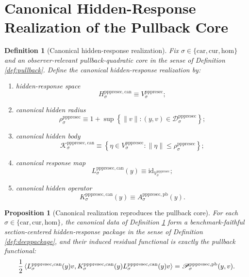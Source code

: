 \documentclass[11pt]{article}
\newcommand{\Car}{\mathrm{car}}
\newcommand{\Cur}{\mathrm{cur}}
\newcommand{\Hom}{\mathrm{hom}}
\newcommand{\PrePreProtoSectionVertical}[1]{V_{#1}^{\mathrm{pppresec}}}
\newcommand{\PrePreProtoSectionResidualBody}[1]{\mathcal D_{#1}^{\mathrm{pppresec}}}
\newcommand{\PrePreProtoSectionPullbackOperator}[1]{A_{#1}^{\mathrm{pppresec,pb}}}
\newcommand{\PrePreProtoSectionPullbackFunctional}[1]{\mathscr P_{#1}^{\mathrm{pppresec,pb}}}
\newcommand{\CanonicalHiddenSpace}[1]{H_{#1}^{\mathrm{pppresec,can}}}
\newcommand{\CanonicalHiddenBody}[1]{\mathcal K_{#1}^{\mathrm{pppresec,can}}}
\newcommand{\CanonicalResponseMap}[1]{L_{#1}^{\mathrm{pppresec,can}}}
\newcommand{\CanonicalHiddenOperator}[1]{K_{#1}^{\mathrm{pppresec,can}}}
\newcommand{\CanonicalHiddenRadius}[1]{\rho_{#1}^{\mathrm{pppresec}}}
\newtheorem{definition}{Definition}
\newtheorem{proposition}{Proposition}
\begin{document}
\section{Canonical Hidden-Response Realization of the Pullback Core}

\begin{definition}[Canonical hidden-response realization]
\label{def:canonical}
Fix \(\sigma\in\{\Car,\Cur,\Hom\}\) and an observer-relevant pullback-quadratic core in the sense of Definition \ref{def:pullback}. Define the canonical hidden-response realization by:
\begin{enumerate}
    \item hidden-response space
    \[
    \CanonicalHiddenSpace{\sigma}
    \equiv
    \PrePreProtoSectionVertical{\sigma};
    \]
    \item canonical hidden radius
    \[
    \CanonicalHiddenRadius{\sigma}
    \equiv
    1+
    \sup\left\{
    \|v\|:(y,v)\in\PrePreProtoSectionResidualBody{\sigma}
    \right\};
    \]
    \item canonical hidden body
    \[
    \CanonicalHiddenBody{\sigma}
    \equiv
    \left\{
    \eta\in\PrePreProtoSectionVertical{\sigma}:
    \|\eta\|\le \CanonicalHiddenRadius{\sigma}
    \right\};
    \]
    \item canonical response map
    \[
    \CanonicalResponseMap{\sigma}(y)
    \equiv
    \mathrm{id}_{\PrePreProtoSectionVertical{\sigma}};
    \]
    \item canonical hidden operator
    \[
    \CanonicalHiddenOperator{\sigma}(y)
    \equiv
    \PrePreProtoSectionPullbackOperator{\sigma}(y).
    \]
\end{enumerate}
\end{definition}

\begin{proposition}[Canonical realization reproduces the pullback core]
\label{prop:canonical}
For each \(\sigma\in\{\Car,\Cur,\Hom\}\), the canonical data of Definition \ref{def:canonical} form a benchmark-faithful section-centered hidden-response package in the sense of Definition \ref{def:deeppackage}, and their induced residual functional is exactly the pullback functional:
\[
\frac{1}{2}
\ev{
\CanonicalResponseMap{\sigma}(y)v,
\CanonicalHiddenOperator{\sigma}(y)
\CanonicalResponseMap{\sigma}(y)v
}
=
\PrePreProtoSectionPullbackFunctional{\sigma}(y,v).
\]
\end{proposition}
\end{document}
